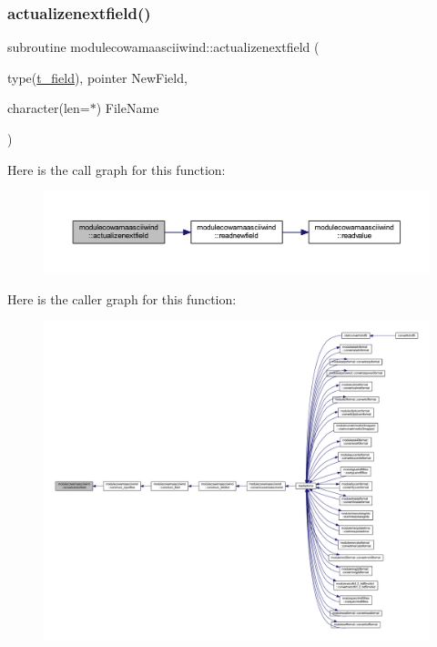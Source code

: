 \subsubsection{\texorpdfstring{actualizenextfield()}{actualizenextfield()}}
{\footnotesize\ttfamily subroutine modulecowamaasciiwind\+::actualizenextfield (\begin{DoxyParamCaption}\item[{type(\mbox{\hyperlink{structmodulecowamaasciiwind_1_1t__field}{t\+\_\+field}}), pointer}]{New\+Field,  }\item[{character(len=$\ast$)}]{File\+Name }\end{DoxyParamCaption})\hspace{0.3cm}{\ttfamily [private]}}

Here is the call graph for this function\+:\nopagebreak
\begin{figure}[H]
\begin{center}
\leavevmode
\includegraphics[width=350pt]{namespacemodulecowamaasciiwind_a267c21bbee12efe50d8afcde5075671c_cgraph}
\end{center}
\end{figure}
Here is the caller graph for this function\+:\nopagebreak
\begin{figure}[H]
\begin{center}
\leavevmode
\includegraphics[width=350pt]{namespacemodulecowamaasciiwind_a267c21bbee12efe50d8afcde5075671c_icgraph}
\end{center}
\end{figure}
\mbox{\label{namespacemodulecowamaasciiwind_ac11c8ada96001555421156bb05d44db1}} 
